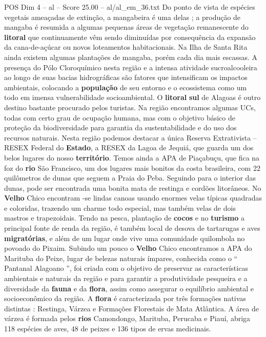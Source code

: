 \begin{textsample}{POS Dim 4 – al – Score 25.00 – al/al\_em\_36.txt}
Do ponto de vista de espécies vegetais ameaçadas de extinção, a mangabeira é uma delas ; a produção de mangaba é resumida a algumas pequenas áreas de vegetação remanescente do \textbf{litoral} que continuamente vêm sendo diminuídas por consequência da expansão da cana-de-açúcar ou novos loteamentos habitacionais.
Na Ilha de Santa Rita ainda existem algumas plantações de mangaba, porém cada dia mais escassas.
A presença do Pólo Cloroquímico nesta região e a intensa atividade sucroalcooleira ao longo de suas bacias hidrográficas são fatores que intensificam os impactos ambientais, colocando a \textbf{população} de seu entorno e o ecossistema como um todo em imensa vulnerabilidade socioambiental.
O \textbf{litoral} \textbf{sul} de Alagoas é outro destino bastante procurado pelos turistas.
Na região encontramos algumas UCs, todas com certo grau de ocupação humana, mas com o objetivo básico de proteção da biodiversidade para garantia da sustentabilidade e do uso dos recursos naturais.
Nesta região podemos destacar a única Reserva Extrativista – RESEX Federal do \textbf{Estado}, a RESEX da Lagoa de Jequiá, que guarda um dos belos lugares do nosso \textbf{território}.
Temos ainda a APA de Piaçabuçu, que fica na foz do \textbf{rio} São Francisco, um dos lugares mais bonitos da costa brasileira, com 22 quilômetros de dunas que seguem a Praia do Peba.
Seguindo para o interior das dunas, pode ser encontrada uma bonita mata de restinga e cordões litorâneos.
No \textbf{Velho} Chico encontram -se lindas canoas usando enormes velas típicas quadradas e coloridas, trazendo um charme todo especial, mas também velas de dois mastros e trapezoidais.
Tendo na pesca, plantação de \textbf{cocos} e no \textbf{turismo} a principal fonte de renda da região, é também local de desova de tartarugas e aves \textbf{migratórias}, e além de um lugar onde vive uma comunidade quilombola no povoado do Pixaim.
Subindo um pouco o \textbf{Velho} Chico encontramos a APA do Marituba do Peixe, lugar de belezas naturais ímpares, conhecida como o “ Pantanal Alagoano ”, foi criada com o objetivo de preservar as características ambientais e naturais da região e para garantir a produtividade pesqueira e a diversidade da \textbf{fauna} e da \textbf{flora}, assim como assegurar o equilíbrio ambiental e socioeconômico da região.
A \textbf{flora} é caracterizada por três formações nativas distintas : Restinga, Várzea e Formações Florestais de Mata Atlântica.
A área de várzea é formada pelos \textbf{rios} Camondongo, Marituba, Perucaba e Piauí, abriga 118 espécies de aves, 48 de peixes e 136 tipos de ervas medicinais.

\end{textsample}
